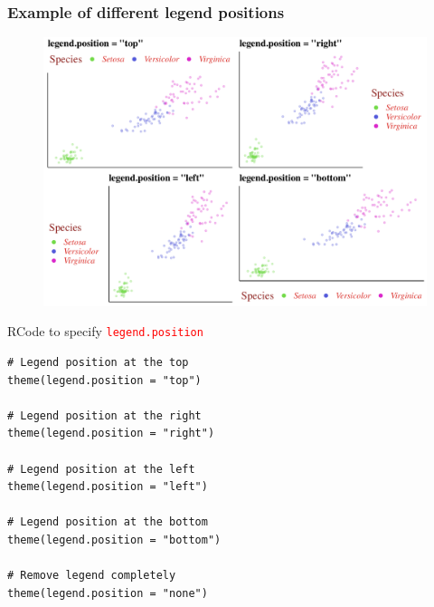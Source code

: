 \documentclass{beamer}
\begin{document}
\begin{frame}\frametitle{Example of different legend positions}
\begin{figure}
\includegraphics[width=0.99\linewidth]{PlotsLec3/LegPos}
\end{figure}
\end{frame}

\begin{frame}[fragile]{RCode to specify \texttt{\textcolor{red}{legend.position}}}
\begin{lstlisting}
# Legend position at the top
theme(legend.position = "top")

# Legend position at the right
theme(legend.position = "right")

# Legend position at the left
theme(legend.position = "left")

# Legend position at the bottom
theme(legend.position = "bottom")

# Remove legend completely
theme(legend.position = "none")                  
\end{lstlisting}
\end{frame}
\end{document}
